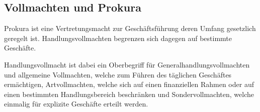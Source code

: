 \subsection{Vollmachten und Prokura}

Prokura ist eine Vertretungsmacht zur Geschäftsführung deren Umfang gesetzlich geregelt ist. Handlungsvollmachten begrenzen sich dagegen auf bestimmte Geschäfte.

Handlungsvollmacht ist dabei ein Oberbegriff für Generalhandlungsvollmachten und allgemeine Vollmachten, welche zum Führen des täglichen Geschäftes ermächtigen, Artvollmachten, welche sich auf einen finanziellen Rahmen oder auf einen bestimmten Handlungsbereich beschränken und Sondervollmachten, welche einmalig für explizite Geschäfte erteilt werden.